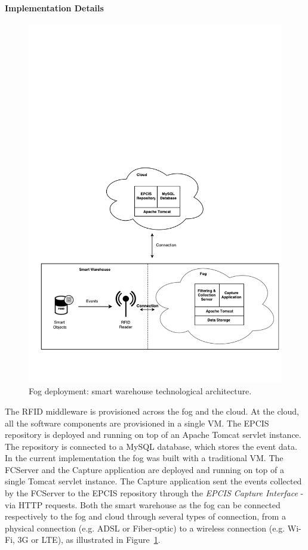 \paragraph{Implementation Details}
\label{par:imp_smart_warehouse_fog}

\begin{figure}[ht!]
\centering
\includegraphics[width=.5\textwidth]{./figures/implementation_fog_architecture}
\caption{Fog deployment: smart warehouse technological architecture.}
\label{fig:implementation_fog_architecture}
\end{figure}

The \gls{RFID} middleware is provisioned across the fog and the cloud. At the cloud,
all the software components are provisioned in a single \gls{VM}. The \gls{EPCIS} repository is deployed
and running on top of an Apache Tomcat servlet instance. The repository is connected to a MySQL
database, which stores the event data. In the current implementation the fog was built with a traditional
\gls{VM}. The \gls{FCServer} and the Capture application are deployed and running on top of a single
Tomcat servlet instance. The Capture application sent the events collected by the \gls{FCServer} to
the \gls{EPCIS} repository through the \textit{\gls{EPCIS} Capture Interface} - via \gls{HTTP} requests.
Both the smart warehouse as the fog can be connected respectively to the fog and cloud through several
types of connection, from a physical connection (e.g. \gls{ADSL} or Fiber-optic) to a wireless connection
(e.g. Wi-Fi, 3G or \gls{LTE}), as illustrated in Figure~\ref{fig:implementation_fog_architecture}. 
